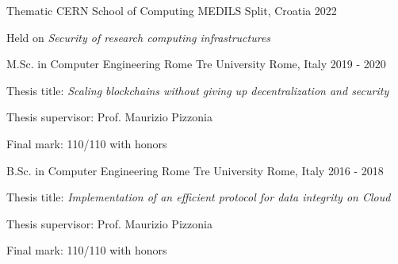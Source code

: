 

\begin{cventries}

  \cventry
    {Thematic CERN School of Computing} %
    {MEDILS} %
    {Split, Croatia} %
    {2022} %
    {
      \begin{cvitems} %
        \item {Held on \textit{Security of research computing infrastructures}}
      \end{cvitems}
    }
    
  \cventry
    {M.Sc. in Computer Engineering} %
    {Rome Tre University} %
    {Rome, Italy} %
    {2019 - 2020} %
    {
      \begin{cvitems} %
        \item {Thesis title: \textit{Scaling blockchains without giving up decentralization and security}}
        \item {Thesis supervisor: Prof. Maurizio Pizzonia}
        \item {Final mark: 110/110 with honors}
      \end{cvitems}
    }
    
  \cventry
    {B.Sc. in Computer Engineering} %
    {Rome Tre University} %
    {Rome, Italy} %
    {2016 - 2018} %
    {
      \begin{cvitems} %
        \item {Thesis title: \textit{Implementation of an efficient protocol for data integrity on Cloud}}
        \item {Thesis supervisor: Prof. Maurizio Pizzonia}
        \item {Final mark: 110/110 with honors}
      \end{cvitems}
    }
\end{cventries}
